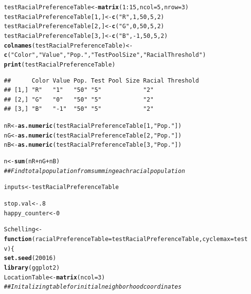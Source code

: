 \documentclass{article}\usepackage[]{graphicx}\usepackage[]{color}
\makeatletter
\newcommand{\hlnum}[1]{\textcolor[rgb]{0.686,0.059,0.569}{#1}}%
\newcommand{\hlstr}[1]{\textcolor[rgb]{0.192,0.494,0.8}{#1}}%
\newcommand{\hlcom}[1]{\textcolor[rgb]{0.678,0.584,0.686}{\textit{#1}}}%
\newcommand{\hlopt}[1]{\textcolor[rgb]{0,0,0}{#1}}%
\newcommand{\hlstd}[1]{\textcolor[rgb]{0.345,0.345,0.345}{#1}}%
\newcommand{\hlkwa}[1]{\textcolor[rgb]{0.161,0.373,0.58}{\textbf{#1}}}%
\newcommand{\hlkwb}[1]{\textcolor[rgb]{0.69,0.353,0.396}{#1}}%
\newcommand{\hlkwc}[1]{\textcolor[rgb]{0.333,0.667,0.333}{#1}}%
\newcommand{\hlkwd}[1]{\textcolor[rgb]{0.737,0.353,0.396}{\textbf{#1}}}%
\newenvironment{kframe}{%
 \def\at@end@of@kframe{}%
 \ifinner\ifhmode%
  \def\at@end@of@kframe{\end{minipage}}%
  \begin{minipage}{\columnwidth}%
 \fi\fi%
 \def\FrameCommand##1{\hskip\@totalleftmargin \hskip-\fboxsep
 \colorbox{shadecolor}{##1}\hskip-\fboxsep
     \hskip-\linewidth \hskip-\@totalleftmargin \hskip\columnwidth}%
 \MakeFramed {\advance\hsize-\width
   \@totalleftmargin\z@ \linewidth\hsize
   \@setminipage}}%
 {\par\unskip\endMakeFramed%
 \at@end@of@kframe}
\newenvironment{knitrout}{}{} %
\makeatother
\begin{document}
\begin{knitrout}
\begin{kframe}
\begin{alltt}
\hlstd{testRacialPreferenceTable} \hlkwb{<-} \hlkwd{matrix}\hlstd{(}\hlnum{1}\hlopt{:}\hlnum{15}\hlstd{,} \hlkwc{ncol} \hlstd{=} \hlnum{5}\hlstd{,} \hlkwc{nrow} \hlstd{=} \hlnum{3}\hlstd{)}
\hlstd{testRacialPreferenceTable[}\hlnum{1}\hlstd{,]} \hlkwb{<-} \hlkwd{c}\hlstd{(}\hlstr{"R"}\hlstd{,}\hlnum{1}\hlstd{,} \hlnum{50}\hlstd{,} \hlnum{5}\hlstd{,} \hlnum{2}\hlstd{)}
\hlstd{testRacialPreferenceTable[}\hlnum{2}\hlstd{,]} \hlkwb{<-} \hlkwd{c}\hlstd{(}\hlstr{"G"}\hlstd{,} \hlnum{0}\hlstd{,} \hlnum{50}\hlstd{,} \hlnum{5}\hlstd{,} \hlnum{2}\hlstd{)}
\hlstd{testRacialPreferenceTable[}\hlnum{3}\hlstd{,]} \hlkwb{<-} \hlkwd{c}\hlstd{(}\hlstr{"B"}\hlstd{,} \hlopt{-}\hlnum{1}\hlstd{,} \hlnum{50}\hlstd{,} \hlnum{5}\hlstd{,} \hlnum{2}\hlstd{)}
\hlkwd{colnames}\hlstd{(testRacialPreferenceTable)} \hlkwb{<-} \hlkwd{c}\hlstd{(}\hlstr{"Color"}\hlstd{,} \hlstr{"Value"}\hlstd{,} \hlstr{"Pop."}\hlstd{,} \hlstr{"Test Pool Size"}\hlstd{,} \hlstr{"Racial Threshold"}\hlstd{)}
\hlkwd{print}\hlstd{(testRacialPreferenceTable)}
\end{alltt}
\begin{verbatim}
##      Color Value Pop. Test Pool Size Racial Threshold
## [1,] "R"   "1"   "50" "5"            "2"             
## [2,] "G"   "0"   "50" "5"            "2"             
## [3,] "B"   "-1"  "50" "5"            "2"
\end{verbatim}
\begin{alltt}
\hlstd{nR} \hlkwb{<-} \hlkwd{as.numeric}\hlstd{(testRacialPreferenceTable[}\hlnum{1}\hlstd{,}\hlstr{"Pop."}\hlstd{])}
\hlstd{nG} \hlkwb{<-} \hlkwd{as.numeric}\hlstd{(testRacialPreferenceTable[}\hlnum{2}\hlstd{,}\hlstr{"Pop."}\hlstd{])}
\hlstd{nB} \hlkwb{<-} \hlkwd{as.numeric}\hlstd{(testRacialPreferenceTable[}\hlnum{3}\hlstd{,}\hlstr{"Pop."}\hlstd{])}

\hlstd{n} \hlkwb{<-} \hlkwd{sum}\hlstd{(nR} \hlopt{+} \hlstd{nG} \hlopt{+} \hlstd{nB)}
\hlcom{## Find total population from summing each racial population}

\hlstd{inputs} \hlkwb{<-} \hlstd{testRacialPreferenceTable}

\hlstd{stop.val} \hlkwb{<-} \hlnum{.8}
\hlstd{happy_counter} \hlkwb{<-} \hlnum{0}


\hlstd{Schelling} \hlkwb{<-} \hlkwa{function}\hlstd{(}\hlkwc{racialPreferenceTable} \hlstd{= testRacialPreferenceTable,} \hlkwc{cyclemax} \hlstd{= testv)\{}
  \hlkwd{set.seed}\hlstd{(}\hlnum{20016}\hlstd{)}
  \hlkwd{library}\hlstd{(ggplot2)}
  \hlstd{LocationTable} \hlkwb{<-} \hlkwd{matrix}\hlstd{(}\hlkwc{ncol} \hlstd{=} \hlnum{3}\hlstd{)}
  \hlcom{## Initalizing table for initial neighborhood coordinates}


\end{alltt}
\end{kframe}
\end{knitrout}
\end{document}
